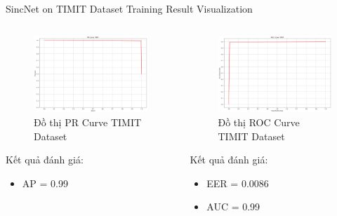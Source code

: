 \documentclass[notheorems, aspectratio=54]{beamer}
\begin{document}
\begin{frame}{SincNet on TIMIT Dataset Training Result Visualization}
	\begin{columns}
		\begin{column}{0.47\textwidth}
			\begin{figure}[H]
				\includegraphics[width=0.9\linewidth]{result/pr_curve_timit.png}
				\caption{Đồ thị PR Curve TIMIT Dataset}
			\end{figure}
		Kết quả đánh giá:
		\begin{itemize}
			\item AP = 0.99
		\end{itemize}
		\end{column}
		\begin{column}{0.5\textwidth}
			\begin{figure}[H]
				\includegraphics[width=0.9\linewidth]{result/roc_curve_timit.png}
				\caption{Đồ thị ROC Curve TIMIT Dataset}
			\end{figure}
		Kết quả đánh giá:
		\begin{itemize}
			\item EER = 0.0086
			\item AUC = 0.99
		\end{itemize}
		\end{column}
	\end{columns}
\end{frame}
\end{document}
